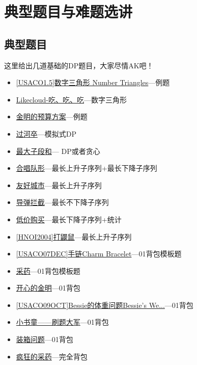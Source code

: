 \section{典型题目与难题选讲}
	\subsection{典型题目}
	这里给出几道基础的DP题目，大家尽情AK吧！
	\begin{itemize}
		\item{\href{https://www.luogu.org/problem/show?pid=1216}{[USACO1.5]数字三角形 Number Triangles}---例题}
		\item{\href{https://www.luogu.org/problem/show?pid=1508}{Likecloud-吃、吃、吃}---数字三角形}
		\item{\href{https://www.luogu.org/problem/show?pid=1064}{金明的预算方案}---例题}
		\item{\href{https://www.luogu.org/problem/show?pid=1002}{过河卒}---模拟式DP}
		\item{\href{https://www.luogu.org/problem/show?pid=1115}{最大子段和}--- DP或者贪心}
		\item{\href{https://www.luogu.org/problem/show?pid=1091}{合唱队形}---最长上升子序列+最长下降子序列}
		\item{\href{https://www.luogu.org/problem/show?pid=2782}{友好城市}---最长上升子序列}
		\item{\href{https://www.luogu.org/problem/show?pid=1020}{导弹拦截}---最长不下降子序列}
		\item{\href{https://www.luogu.org/problem/show?pid=1108}{低价购买}---最长下降子序列+统计}
		\item{\href{https://www.luogu.org/problem/show?pid=2285}{[HNOI2004]打鼹鼠}---最长上升子序列}
		\item{\href{https://www.luogu.org/problem/show?pid=2871}{[USACO07DEC]手链Charm Bracelet}---01背包模板题}
		\item{\href{https://www.luogu.org/problem/show?pid=1048}{采药}---01背包模板题}
		\item{\href{https://www.luogu.org/problem/show?pid=1060}{开心的金明}---01背包}
		\item{\href{https://www.luogu.org/problem/show?pid=2639}{[USACO09OCT]Bessie的体重问题Bessie's We...}---01背包}
		\item{\href{https://www.luogu.org/problem/show?pid=1926}{小书童——刷题大军}---01背包}
		\item{\href{https://www.luogu.org/problem/show?pid=1049}{装箱问题}---01背包}
		\item{\href{https://www.luogu.org/problem/show?pid=1616}{疯狂的采药}---完全背包}

\end{itemize}
